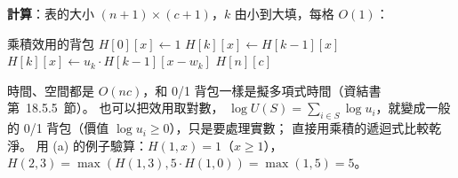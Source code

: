 \begin{pastsoln}
\textbf{計算}：表的大小 $(n + 1) \times (c + 1)$，$k$ 由小到大填，每格 $O(1)$：
\begin{pseudo}{乘積效用的背包}
        \State $H[0][x] \gets 1$
    \EndFor
            \State $H[k][x] \gets H[k-1][x]$
                \State $H[k][x] \gets u_k \cdot H[k-1][x - w_k]$
            \EndIf
        \EndFor
    \EndFor
    \State \Return $H[n][c]$
\EndFunction
\end{pseudo}
時間、空間都是 $O(nc)$，和 0/1 背包一樣是擬多項式時間（資結書第~18.5.5~節）。 也可以把效用取對數，
$\log U(S) = \sum_{i \in S} \log u_i$，就變成一般的 0/1 背包（價值 $\log u_i \ge 0$），只是要處理實數；
直接用乘積的遞迴式比較乾淨。 用 (a) 的例子驗算：$H(1, x) = 1$（$x \ge 1$），$H(2, 3) =
\max(H(1, 3), 5 \cdot H(1, 0)) = \max(1, 5) = 5$。
\end{pastsoln}
